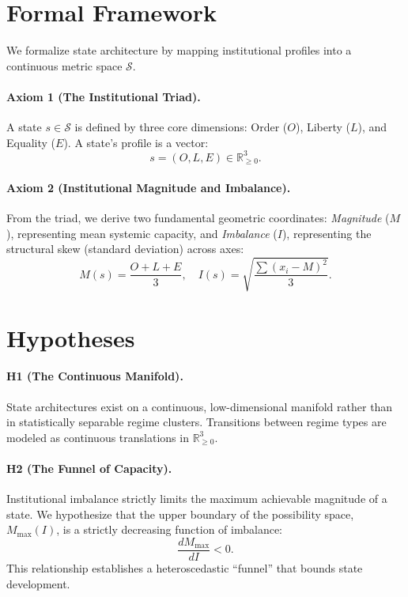 \documentclass[12pt]{article}
\begin{document}
\section{Formal Framework}

We formalize state architecture by mapping institutional profiles into a continuous metric space $\mathcal{S}$. 

\paragraph{Axiom 1 (The Institutional Triad).}
A state $s \in \mathcal{S}$ is defined by three core dimensions: Order ($O$), Liberty ($L$), and Equality ($E$). A state's profile is a vector:
\begin{equation}
    s = (O, L, E) \in \mathbb{R}^3_{\ge 0}.
\end{equation}

\paragraph{Axiom 2 (Institutional Magnitude and Imbalance).}
From the triad, we derive two fundamental geometric coordinates: \textit{Magnitude} ($M$), representing mean systemic capacity, and \textit{Imbalance} ($I$), representing the structural skew (standard deviation) across axes:
\begin{equation}
    M(s) = \frac{O + L + E}{3}, \quad I(s) = \sqrt{\frac{\sum (x_i - M)^2}{3}}.
\end{equation}

\section{Hypotheses}

\paragraph{H1 (The Continuous Manifold).} 
State architectures exist on a continuous, low-dimensional manifold rather than in statistically separable regime clusters. Transitions between regime types are modeled as continuous translations in $\mathbb{R}^3_{\ge 0}$.

\paragraph{H2 (The Funnel of Capacity).} 
Institutional imbalance strictly limits the maximum achievable magnitude of a state. We hypothesize that the upper boundary of the possibility space, $M_{\max}(I)$, is a strictly decreasing function of imbalance:
\begin{equation}
    \frac{d M_{\max}}{d I} < 0.
\end{equation}
This relationship establishes a heteroscedastic ``funnel'' that bounds state development.
\end{document}
